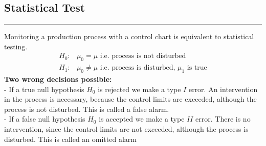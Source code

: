 
\subsection{Statistical Test}
\noindent\rule[\linienAbstand]{\linewidth}{\linienDicke}
Monitoring a production process with a control chart is equivalent to statistical testing.
\begin{equation}
  \begin{split}
    H_0:& \mu_0 = \mu \text{ i.e. process is not disturbed}\\
    H_1:& \mu_0 \neq \mu \text{ i.e. process is disturbed, } \mu_1 \text{ is true}
  \end{split}
\end{equation}
\textbf{Two wrong decisions possible:}\\
 - If a true null hypothesis $H_0$ is rejected we make a type $I$ error. An intervention in the process is necessary, because the control limits are exceeded, although the process is not disturbed. This is called a false alarm.\\
 - If a false null hypothesis $H_0$ is accepted we make a type $II$ error. There is no intervention, since the control limits are not exceeded, although the process is disturbed. This is called an omitted alarm\\

